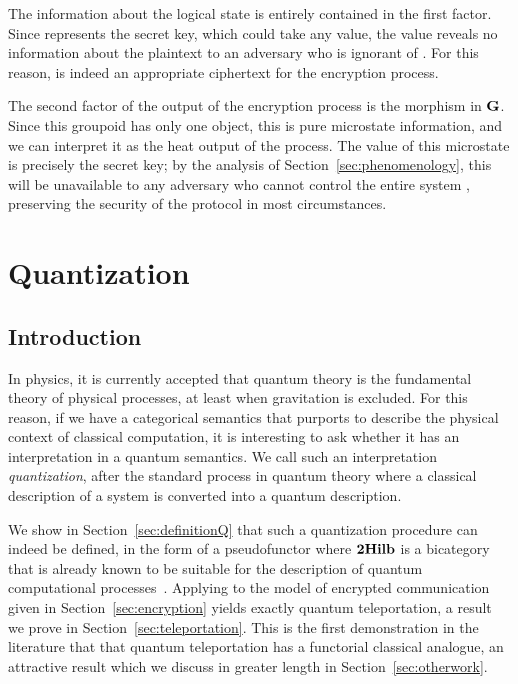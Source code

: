 \documentclass[a4paper,12pt]{article}
\theoremstyle{definition}
\newcommand\cat[1]{{\ensuremath{\bf #1}}}
\renewcommand{\-}[0]{\nobreakdash-\hspace{0pt}}
\begin{document}
The information about the logical state  is entirely contained in the first factor. Since  represents the secret key, which could take any value, the value  reveals no information about the plaintext  to an adversary who is ignorant of . For this reason,  is indeed an appropriate ciphertext for the encryption process.

The second factor of the output of the encryption process is the morphism  in \cat G. Since this groupoid has only one object, this is pure microstate information, and we can interpret it as the heat output of the process. The value of this microstate is precisely the secret key; by the analysis of Section~\ref{sec:phenomenology}, this will be unavailable to any adversary who cannot control the entire system , preserving the security of the protocol in most circumstances.

\section{Quantization}
\label{sec:quantum}

\subsection{Introduction}

\noindent
In physics, it is currently accepted that quantum theory is the fundamental theory of physical processes, at least when gravitation is excluded. For this reason, if we have a categorical semantics that purports to describe the physical context of classical computation, it is interesting to ask whether it has an interpretation in a quantum semantics. We call such an interpretation \emph{quantization}, after the standard process in quantum theory where a classical description of a system is converted into a quantum description.

We show in Section~\ref{sec:definitionQ} that such a quantization procedure can indeed be defined, in the form of a pseudofunctor  where \cat{2Hilb} is a bicategory that is already known to be suitable for the description of quantum computational processes~\cite{b97-hda2, v12-hsqp}.
Applying  to the model of encrypted communication given in Section~\ref{sec:encryption} yields exactly quantum teleportation, a result we prove in Section~\ref{sec:teleportation}. This is the first demonstration in the literature that that quantum teleportation has a functorial classical analogue, an attractive result which we discuss in greater length in Section~\ref{sec:otherwork}.
\end{document}
